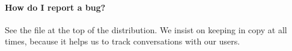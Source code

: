 \paragraph{How do I report a bug?}
See the file  at the top of the
distribution. We insist on keeping  in
copy at all times, because it helps us to track conversations with our
users.


